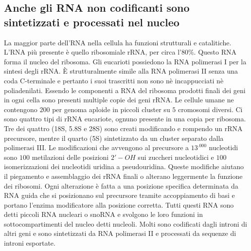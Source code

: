 \subsection{Anche gli RNA non codificanti sono sintetizzati e processati nel nucleo}
La maggior parte dell'RNA nella cellula ha funzioni strutturali e catalitiche. L'RNA pi\`u presente \`e quello ribosomiale rRNA, per circa l'$80\%$. Questo RNA forma il nucleo del
ribosoma. Gli eucarioti possiedono la RNA polimerasi I per la sintesi degli rRNA. \`E strutturalmente simile alla RNA polimerasi II senza una coda C-terminale e pertanto i suoi 
trascritti non sono n\`e incappucciati n\`e poliadenilati. Essendo le componenti a RNA del ribosoma prodotti finali dei geni in ogni cella sono presenti multiple copie dei geni rRNA. Le
cellule umane ne contengono $200$ per genoma aploide in piccoli cluster su $5$ cromosomi diversi. Ci sono quattro tipi di rRNA eucariote, ognuno presente in una copia per ribosoma. Tre
dei quattro (18S, 5.8S e 28S) sono creati modificando e rompendo un rRNA precursore, mentre il quarto (5S) sintetizzato da un cluster separato dalla polimerasi III. Le modificazioni
che avvengono al precursore a $13^.000$ nucleotidi sono $100$ metilazioni delle posizioni $2'-OH$ sui zuccheri nucleotidici e $100$ isomerizzazioni dei nucleotidi uridina a 
pseudouridina. Queste modifiche aiutano il piegamento e assemblaggio dei rRNA finali o alterano leggermente la funzione dei ribosomi. Ogni alterazione \`e fatta a una posizione specifica
determinata da RNA guida che si posizionano sul precursore tramite accoppiamento di basi e portano l'enzima modificatore alla posizione corretta. Tutti questi RNA sono detti piccoli RNA 
nucleari o snoRNA e svolgono le loro funzioni in sottocompartimenti del nucleo detti nucleoli. Molti sono codificati dagli introni di altri geni e sono sintetizzati da RNA polimerasi II
e processati da sequenze di introni esportate.
